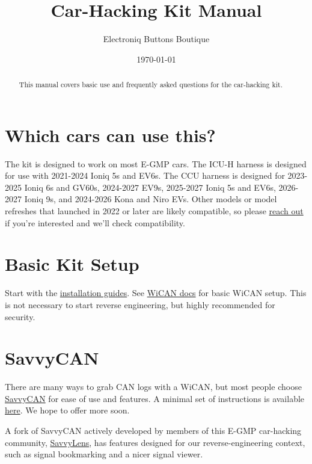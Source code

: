 \documentclass[superscriptaddress,onecolumn,floatfix]{revtex4-2}
\begin{document}
                            
\begin{abstract}
  This manual covers basic use and frequently asked questions for the car-hacking kit.
\end{abstract}
\title{Car-Hacking Kit Manual}
\author{Electroniq Buttons Boutique}
\date{\today}

\maketitle


\section{Which cars can use this?} \label{sect:eligibility}
The kit is designed to work on most E-GMP cars. The ICU-H harness is designed for use with 2021-2024 Ioniq 5s and EV6s. The CCU harness is designed for 2023-2025 Ioniq 6s and GV60s, 2024-2027 EV9s, 2025-2027 Ioniq 5s and EV6s, 2026-2027 Ioniq 9s, and 2024-2026 Kona and Niro EVs. Other models or model refreshes that launched in 2022 or later are likely compatible, so please \href{mailto:requests@electroniqbuttons.com}{reach out} if you're interested and we'll check compatibility. 

\section{Basic Kit Setup}
Start with the \href{https://github.com/tylerharvey/Ioniq5_CAN/tree/main/guides/}{installation guides}. See \href{https://meatpihq.github.io/wican-fw/config/wifi}{WiCAN docs} for basic WiCAN setup. This is not necessary to start reverse engineering, but highly recommended for security.

\section{SavvyCAN}
There are many ways to grab CAN logs with a WiCAN, but most people choose \href{https://www.savvycan.com/}{SavvyCAN} for ease of use and features. A minimal set of instructions is available \href{https://meatpihq.github.io/wican-fw/savvycan/usage}{here}. We hope to offer more soon.

A fork of SavvyCAN actively developed by members of this E-GMP car-hacking community, \href{https://github.com/SuperSuave/SavvyLens}{SavvyLens}, has features designed for our reverse-engineering context, such as signal bookmarking and a nicer signal viewer.
\end{document}
